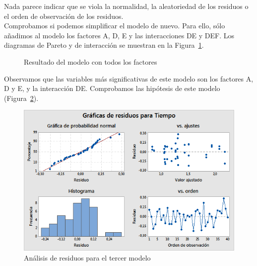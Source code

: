 \documentclass[12pt,a4paper,twoside,openright,titlepage,final]{article}
\begin{document}
Nada parece indicar que se viola la normalidad, la aleatoriedad de los residuos o el orden de observación de los residuos.\\

Comprobamos si podemos simplificar el modelo de nuevo. Para ello, sólo añadimos al modelo los factores A, D, E y las interacciones DE y DEF. Los diagramas de Pareto y de interacción se muestran en la Figura~\ref{fig:resultado_experimento_fraccional_3}.\\

\begin{figure}[htbp!]
	\centering
	\caption{Resultado del modelo con todos los factores} \label{fig:resultado_experimento_fraccional_3}
\end{figure}

Observamos que las variables más significativas de este modelo son los factores A, D y E, y la interacción DE. Comprobamos las hipótesis de este modelo (Figura~\ref{fig:residuos_3}).\\

\begin{figure}[htbp!]
	\centering
	\includegraphics[width=0.7\linewidth]{imagenes/Experimento_fraccional/Graficas_de_residuos_para_Tiempo_3}
	\caption{Análisis de residuos para el tercer modelo}
	\label{fig:residuos_3}
\end{figure}
\end{document}
